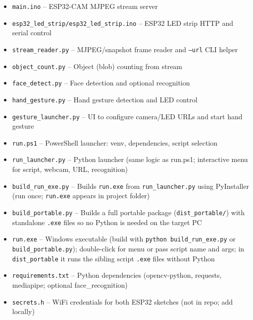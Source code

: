\documentclass[a4paper,12pt]{article}
\begin{document}
\begin{itemize}
    \item \texttt{main.ino} -- ESP32-CAM MJPEG stream server
    \item \texttt{esp32\_led\_strip/esp32\_led\_strip.ino} -- ESP32 LED strip HTTP and serial control
    \item \texttt{stream\_reader.py} -- MJPEG/snapshot frame reader and \texttt{--url} CLI helper
    \item \texttt{object\_count.py} -- Object (blob) counting from stream
    \item \texttt{face\_detect.py} -- Face detection and optional recognition
    \item \texttt{hand\_gesture.py} -- Hand gesture detection and LED control
    \item \texttt{gesture\_launcher.py} -- UI to configure camera/LED URLs and start hand gesture
    \item \texttt{run.ps1} -- PowerShell launcher: venv, dependencies, script selection
    \item \texttt{run\_launcher.py} -- Python launcher (same logic as run.ps1; interactive menu for script, webcam, URL, recognition)
    \item \texttt{build\_run\_exe.py} -- Builds \texttt{run.exe} from \texttt{run\_launcher.py} using PyInstaller (run once; \texttt{run.exe} appears in project folder)
    \item \texttt{build\_portable.py} -- Builds a full portable package (\texttt{dist\_portable/}) with standalone \texttt{.exe} files so no Python is needed on the target PC
    \item \texttt{run.exe} -- Windows executable (build with \texttt{python build\_run\_exe.py} or \texttt{build\_portable.py}); double-click for menu or pass script name and args; in \texttt{dist\_portable} it runs the sibling script \texttt{.exe} files without Python
    \item \texttt{requirements.txt} -- Python dependencies (opencv-python, requests, mediapipe; optional face\_recognition)
    \item \texttt{secrets.h} -- WiFi credentials for both ESP32 sketches (not in repo; add locally)
\end{itemize}
\end{document}
